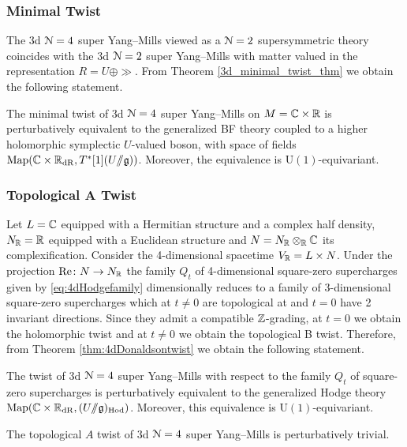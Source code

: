\documentclass[10pt, oneside]{article}
\renewcommand{\Re}{\mathrm{Re}}
\renewcommand{\U}{\mathrm{U}}
\newcommand{\ham}{/\!\!/}
\begin{document}
\subsubsection{Minimal Twist}
\label{sect:3d_4_minimal_twist}
The 3d $\mathcal N=4$ super Yang--Mills viewed as a $\mathcal N=2$ supersymmetric theory coincides with the 3d $\mathcal N=2$ super Yang--Mills with matter valued in the representation $R = U \oplus \gg$. From Theorem \ref{3d_minimal_twist_thm} we obtain the following statement.

\begin{theorem} \label{3d_4_minimal_twist_thm}
The minimal twist of 3d $\mathcal N=4$ super Yang--Mills on $M=\mathbb C\times \mathbb R$ is perturbatively equivalent to the generalized BF theory coupled to a higher holomorphic symplectic $U$-valued boson, with space of fields $\mr{Map}(\CC \times \RR_{\mr{dR}}, T^*[1](U\ham \gg))$. Moreover, the equivalence is $\U(1)$-equivariant.
\end{theorem}

\subsubsection{Topological A Twist}
\label{sect:3d_4_A_twist}
Let $L=\mathbb C$ equipped with a Hermitian structure and a complex half density, $N_\mathbb R=\mathbb R$ equipped with a Euclidean structure and $N=N_\mathbb R\otimes_\mathbb R\mathbb C$ its complexification. Consider the 4-dimensional spacetime $V_\mathbb R=L\times N$. Under the projection $\Re\colon N\rightarrow N_\RR$ the family $Q_t$ of 4-dimensional square-zero supercharges given by \eqref{eq:4dHodgefamily} dimensionally reduces to a family of 3-dimensional square-zero supercharges which at $t\neq 0$ are topological at and $t=0$ have 2 invariant directions. Since they admit a compatible $\mathbb Z$-grading, at $t=0$ we obtain the holomorphic twist and at $t\neq 0$ we obtain the topological B twist. Therefore, from Theorem \ref{thm:4dDonaldsontwist} we obtain the following statement.

\begin{theorem}
The twist of 3d $\mathcal N=4$ super Yang--Mills with respect to the family $Q_t$ of square-zero supercharges is perturbatively equivalent to the generalized Hodge theory $\mr{Map}(\CC \times \RR_{\mr{dR}}, (U\ham \gg)_{\mr{Hod}})$. Moreover, this equivalence is $\U(1)$-equivariant.
\label{3d_4_A_twist_thm}
\end{theorem}

\begin{corollary}
The topological $A$ twist of 3d $\mathcal N=4$ super Yang--Mills is perturbatively trivial.
\end{corollary}
\end{document}
